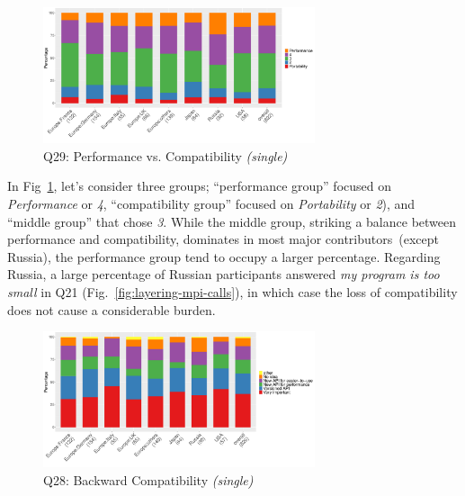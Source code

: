 \documentclass[preprint,5p,times]{elsarticle}
\def\myquote#1{{\it #1}}
\newcommand{\revision}[2]{{\color{blue}#2}}
\def\mcountries{major contributors\xspace{}}%
\begin{document}
\begin{figure}[tb]
\begin{center}
\includegraphics[width=8.0cm]{R-scripts/Q29.pdf}
\vspace{-1.5mm}
\caption{Q29: Performance vs. Compatibility {\it(single)}}
\label{fig:performance-vs-compatibility}
\vspace{-3mm}%
\end{center}
\end{figure}

In Fig~\ref{fig:performance-vs-compatibility}, let's consider three
groups; ``performance group'' focused on \myquote{Performance} or
  \myquote{4}, ``compatibility group'' focused on
    \myquote{Portability} or \myquote{2}), and ``middle group''
    \revision{who}{that} chose \myquote{3}. While the middle group,
    striking a balance
between performance and compatibility, dominates in most \mcountries\ (\revision{excepting}{except}
Russia), the performance group tend to occupy a larger percentage. Regarding
Russia, a large percentage of Russian participants answered \myquote{my program
is too small} in Q21 (Fig.~\ref{fig:layering-mpi-calls}), in which case the loss
of compatibility does not cause a considerable burden.

\begin{figure}[tb]
\begin{center}
\includegraphics[width=8.0cm]{R-scripts/Q28.pdf}
\vspace{-1.5mm}
\caption{Q28: Backward Compatibility {\it(single)}}
\label{fig:compatibility}
\vspace{-3mm}%
\end{center}
\end{figure}
\end{document}
